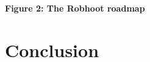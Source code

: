 \documentclass[10pt, a4paper, twocolumn]{article} %
\begin{document}
{\small {\bf Figure 2: The Robhoot roadmap}}




\section{Conclusion}



\printbibliography[title={Bibliography}] %

\end{document}
